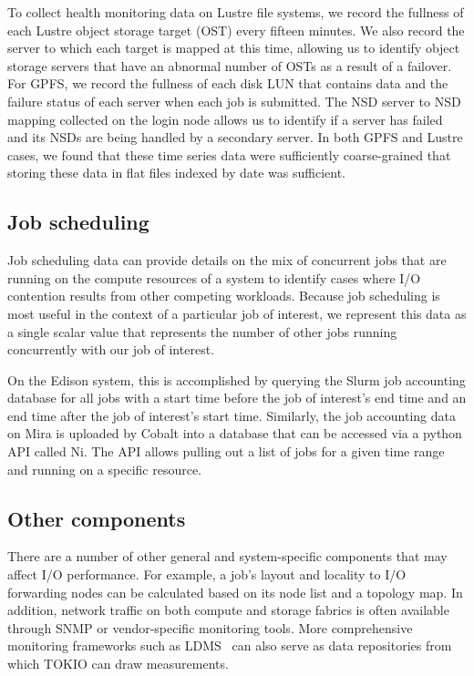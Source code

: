 To collect health monitoring data on Lustre file systems, we record the fullness of each Lustre object storage target (OST) every fifteen minutes.
We also record the server to which each target is mapped at this time, allowing us to identify object storage servers that have an abnormal number of OSTs as a result of a failover.
For GPFS, we record the fullness of each disk LUN that contains data and the failure status of each server when each job is submitted.
The NSD server to NSD mapping collected on the login node allows us to identify if a server has failed and its NSDs are being handled by a secondary server.
In both GPFS and Lustre cases, we found that these time series data were sufficiently coarse-grained that storing these data in flat files indexed by date was sufficient.

\subsection{Job scheduling} \label{sec:methods/scheduling}

Job scheduling data can provide details on the mix of concurrent jobs that are running on the compute resources of a system to identify cases where I/O contention results from other competing workloads.
Because job scheduling is most useful in the context of a particular job of interest, we represent this data as a single scalar value that represents the number of other jobs running concurrently with our job of interest.

On the Edison system, this is accomplished by querying the Slurm job accounting database for all jobs with a start time before the job of interest's end time and an end time after the job of interest's start time.
Similarly, the job accounting data on Mira is uploaded by Cobalt into a database that can be accessed via a python API called Ni.
The API allows pulling out a list of jobs for a given time range and running on a specific resource.

\subsection{Other components} \label{sec:methods/other}

There are a number of other general and system-specific components that may affect I/O performance.  For example, a job's layout and locality to I/O forwarding nodes can be calculated based on its node list and a topology map.
In addition, network traffic on both compute and storage fabrics is often available through SNMP or vendor-specific monitoring tools.
More comprehensive monitoring frameworks such as LDMS~\cite{7013000} can also serve as data repositories from which TOKIO can draw measurements.

